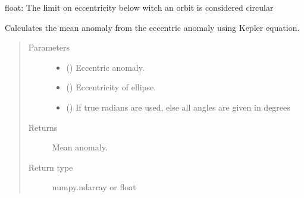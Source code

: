 \documentclass[letterpaper,10pt,english]{sphinxmanual}
\begin{document}

\begin{fulllineitems}
\label{\detokenize{modules/dpt_tools:dpt_tools.e_lim}}
float: The limit on eccentricity below witch an orbit is considered circular

\end{fulllineitems}


\begin{fulllineitems}
\label{\detokenize{modules/dpt_tools:dpt_tools.eccentric2mean}}
Calculates the mean anomaly from the eccentric anomaly using Kepler equation.
\begin{quote}\begin{description}
\item[{Parameters}] \leavevmode\begin{itemize}
\item {} 
 () \textendash{} Eccentric anomaly.

\item {} 
 () \textendash{} Eccentricity of ellipse.

\item {} 
 () \textendash{} If true radians are used, else all angles are given in degrees

\end{itemize}

\item[{Returns}] \leavevmode
Mean anomaly.

\item[{Return type}] \leavevmode
numpy.ndarray or float

\end{description}\end{quote}

\end{fulllineitems}
\end{document}
